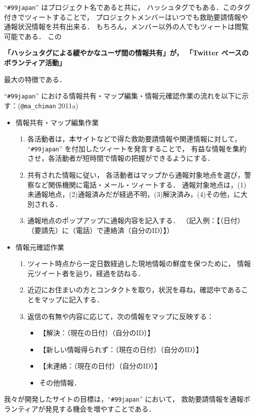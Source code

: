 \documentclass[japanese]{jnlp_1.4}
\begin{document}
``{\tt \#99japan}'' はプロジェクト名であると共に，
ハッシュタグでもある．このタグ付きでツィートすることで，
プロジェクトメンバーはいつでも救助要請情報や通報状況情報を共有出来る．
もちろん，メンバー以外の人でもツィートは閲覧可能である．
この{\bf 「ハッシュタグによる緩やかなユーザ間の情報共有」が，
  「Twitter ベースのボランティア活動」
  
  最大の特徴である．
}

    ``{\tt \#99japan}'' における情報共有・マップ編集・情報元確認作業の流れを以下に示す：(\texttt{@ma\_chiman} 2011a)\nocite{99japan2}
\begin{itemize}
\item {情報共有・マップ編集作業}
  \begin{enumerate}
  \item {各活動者は，本サイトなどで得た救助要請情報や関連情報に対して，
    ``{\tt \#99japan}'' を付加したツィートを発言することで，
    有益な情報を集約させ，各活動者が短時間で情報の把握ができるようにする．}
  \item {共有された情報に従い，
    各活動者はマップから通報対象地点を選び，警察など関係機関に電話・メール・ツィートする．
    通報対象地点は，(1)未通報地点，(2)通報済みだが経過不明，(3)解決済み，(4)その他，に大別される．}
  \item {通報地点のポップアップに通報内容を記入する．
    （記入例：【（日付） （要請先）に（電話）で連絡済（自分のID）】）}
  \end{enumerate}
\item {情報元確認作業}
  \begin{enumerate}
\item 
  ツィート時点から一定日数経過した現地情報の鮮度を保つために，
  情報元ツイート者を辿り，経過を訪ねる．
\item 近辺にお住まいの方とコンタクトを取り，状況を尋ね，確認中であることをマップに記入する．
\item 返信の有無や内容に応じて，次の情報をマップに反映する：
  \begin{itemize}
  \item 【解決：（現在の日付）（自分のID）】
  \item 【新しい情報得られず：（現在の日付）（自分のID）】
  \item 【未連絡：（現在の日付）（自分のID）】
  \item  その他情報．
  \end{itemize}
\end{enumerate}
\end{itemize}
我々が開発したサイトの目標は，``{\tt \#99japan}'' において，
救助要請情報を通報ボランティアが発見する機会を増やすことである．
\end{document}
